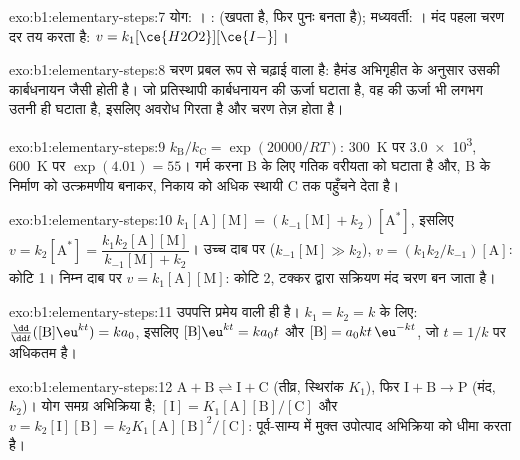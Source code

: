 \begin{solution}{exo:b1:elementary-steps:7}
योग: । :  (खपता है, फिर
पुनः बनता है); मध्यवर्ती: । मंद पहला चरण
दर तय करता है: $v = k_1[\ce{H2O2}][\ce{I-}]$।
\end{solution}

\begin{solution}{exo:b1:elementary-steps:8}
चरण प्रबल रूप से चढ़ाई वाला है: हैमंड अभिगृहीत के अनुसार उसकी  कार्बधनायन जैसी होती है। जो प्रतिस्थापी कार्बधनायन की ऊर्जा घटाता है,
वह  की ऊर्जा भी लगभग उतनी ही घटाता है, इसलिए
अवरोध गिरता है और चरण तेज़ होता है।
\end{solution}

\begin{solution}{exo:b1:elementary-steps:9}
$k_{\mathrm B}/k_{\mathrm C} = \exp(20000/RT)$: \qty{300}{K} पर \num{3.0e3},
\qty{600}{K} पर $\exp(4.01) = 55$। गर्म करना B के लिए गतिक वरीयता को घटाता है
और, B के निर्माण को उत्क्रमणीय बनाकर, निकाय को
अधिक स्थायी C तक पहुँचने देता है।
\end{solution}

\begin{solution}{exo:b1:elementary-steps:10}
$k_1[\mathrm{A}][\mathrm{M}] = (k_{-1}[\mathrm{M}] + k_2)[\mathrm{A}^*]$,
इसलिए $v = k_2[\mathrm{A}^*] = \dfrac{k_1k_2[\mathrm{A}][\mathrm{M}]}{k_{-1}[\mathrm{M}]
+ k_2}$। उच्च दाब पर ($k_{-1}[\mathrm{M}] \gg k_2$), $v =
(k_1k_2/k_{-1})[\mathrm{A}]$: कोटि 1। निम्न दाब पर $v =
k_1[\mathrm{A}][\mathrm{M}]$: कोटि 2, टक्कर द्वारा सक्रियण
मंद चरण बन जाता है।
\end{solution}

\begin{solution}{exo:b1:elementary-steps:11}
उपपत्ति प्रमेय वाली ही है। $k_1 = k_2 = k$ के लिए:
$\frac{\dd}{\dd t}([\mathrm{B}]\eu^{kt}) = ka_0$, इसलिए $[\mathrm{B}]\eu^{kt} =
ka_0t$ और $[\mathrm{B}] = a_0kt\,\eu^{-kt}$, जो $t = 1/k$ पर अधिकतम है।
\end{solution}

\begin{solution}{exo:b1:elementary-steps:12}
$\mathrm{A} + \mathrm{B} \rightleftharpoons \mathrm{I} + \mathrm{C}$ (तीव्र,
स्थिरांक $K_1$), फिर $\mathrm{I} + \mathrm{B} \to \mathrm{P}$ (मंद,
$k_2$)। योग समग्र अभिक्रिया है; $[\mathrm{I}] =
K_1[\mathrm{A}][\mathrm{B}]/[\mathrm{C}]$ और $v = k_2[\mathrm{I}][\mathrm{B}]
= k_2K_1[\mathrm{A}][\mathrm{B}]^2/[\mathrm{C}]$: पूर्व-साम्य में मुक्त
उपोत्पाद अभिक्रिया को धीमा करता है।
\end{solution}

